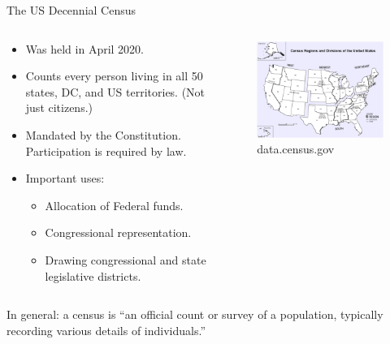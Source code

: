 \documentclass[aspectratio=169]{../latex_main/tntbeamer}  %
\begin{document}
	
		\begin{frame}{The US Decennial Census}
	     \begin{columns}
	         \begin{column}{.4\textwidth}
	         \begin{itemize}
	             \item Was held in April 2020.
	             \item Counts every person living in all 50 states, DC, and US territories. (Not just citizens.)
	             \item Mandated by the Constitution. Participation is required by law.
	             \item Important uses:
	             \begin{itemize}
	                 \item Allocation of Federal funds.
	                 \item Congressional representation.
	                 \item Drawing congressional and state legislative districts.
	             \end{itemize}
	         \end{itemize}
	         

	         \end{column}
	         \begin{column}{.4\textwidth}
	                \begin{figure}
	                    \centering
	                    \includegraphics[scale=.5]{Bild6}
	                    \caption{data.census.gov}
	                \end{figure}
	                

	         \end{column}
	         
	         
	         
	     \end{columns}
	     In general: a census is “an official count or survey of a population, typically recording various details of individuals.”
	\end{frame}
	
\end{document}
